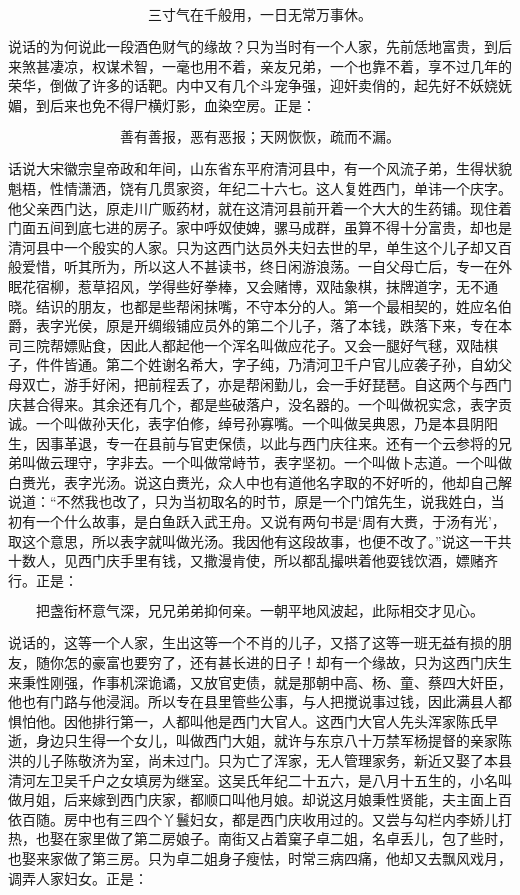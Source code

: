 \[
三寸气在千般用，一日无常万事休。
\]

说话的为何说此一段酒色财气的缘故？只为当时有一个人家，先前恁地富贵，到后来煞甚凄凉，权谋术智，一毫也用不着，亲友兄弟，一个也靠不着，享不过几年的荣华，倒做了许多的话靶。内中又有几个斗宠争强，迎奸卖俏的，起先好不妖娆妩媚，到后来也免不得尸横灯影，血染空房。正是：

\[
善有善报，恶有恶报；天网恢恢，疏而不漏。
\]

话说大宋徽宗皇帝政和年间，山东省东平府清河县中，有一个风流子弟，生得状貌魁梧，性情潇洒，饶有几贯家资，年纪二十六七。这人复姓西门，单讳一个庆字。他父亲西门达，原走川广贩药材，就在这清河县前开着一个大大的生药铺。现住着门面五间到底七进的房子。家中呼奴使婢，骡马成群，虽算不得十分富贵，却也是清河县中一个殷实的人家。只为这西门达员外夫妇去世的早，单生这个儿子却又百般爱惜，听其所为，所以这人不甚读书，终日闲游浪荡。一自父母亡后，专一在外眠花宿柳，惹草招风，学得些好拳棒，又会赌博，双陆象棋，抹牌道字，无不通晓。结识的朋友，也都是些帮闲抹嘴，不守本分的人。第一个最相契的，姓应名伯爵，表字光侯，原是开绸缎铺应员外的第二个儿子，落了本钱，跌落下来，专在本司三院帮嫖贴食，因此人都起他一个浑名叫做应花子。又会一腿好气毬，双陆棋子，件件皆通。第二个姓谢名希大，字子纯，乃清河卫千户官儿应袭子孙，自幼父母双亡，游手好闲，把前程丢了，亦是帮闲勤儿，会一手好琵琶。自这两个与西门庆甚合得来。其余还有几个，都是些破落户，没名器的。一个叫做祝实念，表字贡诚。一个叫做孙天化，表字伯修，绰号孙寡嘴。一个叫做吴典恩，乃是本县阴阳生，因事革退，专一在县前与官吏保债，以此与西门庆往来。还有一个云参将的兄弟叫做云理守，字非去。一个叫做常峙节，表字坚初。一个叫做卜志道。一个叫做白赉光，表字光汤。说这白赉光，众人中也有道他名字取的不好听的，他却自己解说道：“不然我也改了，只为当初取名的时节，原是一个门馆先生，说我姓白，当初有一个什么故事，是白鱼跃入武王舟。又说有两句书是‘周有大赉，于汤有光’，取这个意思，所以表字就叫做光汤。我因他有这段故事，也便不改了。”说这一干共十数人，见西门庆手里有钱，又撒漫肯使，所以都乱撮哄着他耍钱饮酒，嫖赌齐行。正是：

\[
把盏衔杯意气深，兄兄弟弟抑何亲。
一朝平地风波起，此际相交才见心。
\]

说话的，这等一个人家，生出这等一个不肖的儿子，又搭了这等一班无益有损的朋友，随你怎的豪富也要穷了，还有甚长进的日子！却有一个缘故，只为这西门庆生来秉性刚强，作事机深诡谲，又放官吏债，就是那朝中高、杨、童、蔡四大奸臣，他也有门路与他浸润。所以专在县里管些公事，与人把搅说事过钱，因此满县人都惧怕他。因他排行第一，人都叫他是西门大官人。这西门大官人先头浑家陈氏早逝，身边只生得一个女儿，叫做西门大姐，就许与东京八十万禁军杨提督的亲家陈洪的儿子陈敬济为室，尚未过门。只为亡了浑家，无人管理家务，新近又娶了本县清河左卫吴千户之女填房为继室。这吴氏年纪二十五六，是八月十五生的，小名叫做月姐，后来嫁到西门庆家，都顺口叫他月娘。却说这月娘秉性贤能，夫主面上百依百随。房中也有三四个丫鬟妇女，都是西门庆收用过的。又尝与勾栏内李娇儿打热，也娶在家里做了第二房娘子。南街又占着窠子卓二姐，名卓丢儿，包了些时，也娶来家做了第三房。只为卓二姐身子瘦怯，时常三病四痛，他却又去飘风戏月，调弄人家妇女。正是：

